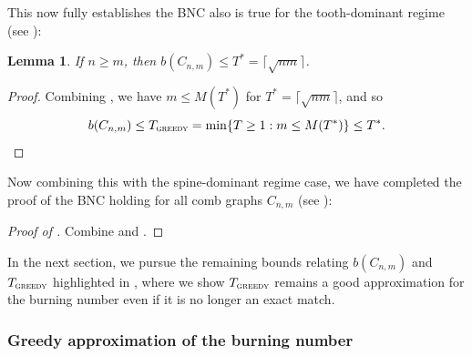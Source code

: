 \documentclass{article}
\newcommand{\gr}{\textsc{greedy}}
\newtheorem{lemma}{Lemma}
\begin{document}
This now fully establishes the BNC also is true for the tooth-dominant regime (see ):

\begin{lemma}\label{l: tooth upper}
    If $n \ge m$, then $b(C_{n,m}) \le T^* = \lceil \sqrt{nm}\rceil$.
\end{lemma}
\begin{proof}
    Combining , we have $m \le M(T^*)$ for $T^* = \lceil \sqrt{nm}\rceil$, and so
    \[
    b(C_{n,m}) \le T_\gr = \min\{T \ge 1: m \le M(T^*)\} \le T^*.
    \]
\end{proof}

Now combining this with the spine-dominant regime case, we have completed the proof of the BNC holding for all comb graphs $C_{n,m}$ (see ):

\begin{proof}[Proof of ]
    Combine  and .
\end{proof}

In the next section, we pursue the remaining bounds relating $b(C_{n,m})$ and $T_\gr$ highlighted in , where we show $T_\gr$ remains a good approximation for the burning number even if it is no longer an exact match.

\subsubsection{Greedy approximation of the burning number}
\end{document}
